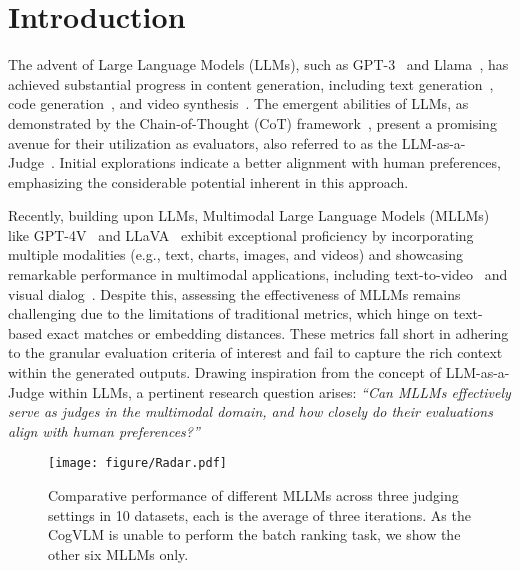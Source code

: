 \section{Introduction}
The advent of Large Language Models (LLMs), such as GPT-3~\cite{openai2023gpt4} and Llama~\cite{touvron2023llama}, has achieved substantial progress in content generation, 
including text generation~\citep{openai2023gpt4}, code generation~\cite{roziere2023code}, and video synthesis~\citep{wu2023next}. The emergent abilities of LLMs, as demonstrated by the Chain-of-Thought (CoT) framework~\cite{wei2022chain}, present a promising avenue for their utilization as evaluators, also referred to as the LLM-as-a-Judge~\citep{zheng2023judging}. Initial explorations indicate a better alignment with human preferences, emphasizing the considerable potential inherent in this approach.

Recently, building upon LLMs, Multimodal Large Language Models (MLLMs) like GPT-4V~\cite{openai2023gpt4v} and LLaVA~\cite{liu2023llava} exhibit exceptional proficiency by incorporating multiple modalities (e.g., text, charts, images, and videos) and showcasing remarkable performance in multimodal applications, including text-to-video~\cite{wu2023next} and visual dialog~\cite{cai2023low}.
Despite this, 
assessing the effectiveness of MLLMs remains challenging due to the limitations of traditional metrics, which hinge on text-based exact matches or embedding distances. These metrics fall short in adhering to the granular evaluation criteria of interest and fail to capture the rich context within the generated outputs.
Drawing inspiration from the concept of LLM-as-a-Judge within LLMs, a pertinent research question arises: \textit{``Can MLLMs effectively serve as judges in the multimodal domain, and how closely do their evaluations align with human preferences?''}

\begin{figure*}[t]
\vspace{-5pt}
    \centering
    \texttt{[image: figure/Radar.pdf]}
      \vspace{-13pt}
    \caption{Comparative performance of different MLLMs across three judging settings in 10 datasets, each is the average of three iterations. As the CogVLM is unable to perform the batch ranking task, we show the other six MLLMs only.}
    \label{fig: Radar Figure}
      \vspace{-12pt}
\end{figure*}

